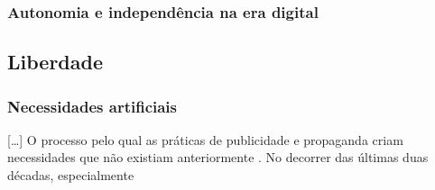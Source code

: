 \subsubsection{Autonomia e independência na era digital}

\subsection{Liberdade}

\subsubsection{Necessidades artificiais}\label{necessidades_artificiais}
[\dots] O processo pelo qual as práticas de publicidade e propaganda criam necessidades que não existiam anteriormente
\cite[3]{jameshulbert1968}. No decorrer das últimas duas décadas, especialmente

